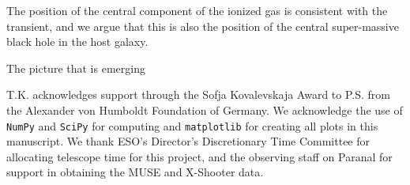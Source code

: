 \documentclass[traditabstract]{aa}
\begin{document}
The position of the central component of the ionized gas is consistent with the transient, and we argue that this is also the position of the central super-massive black hole in the host galaxy. 


The picture that is emerging


\begin{acknowledgements}

T.K. acknowledges support through the Sofja Kovalevskaja Award to P.S. from the Alexander von Humboldt Foundation of Germany.  We acknowledge the use of \texttt{NumPy} and \texttt{SciPy} \citep{Walt:2011:NAS:1957373.1957466} for computing and \texttt{matplotlib} \citep{Hunter:2007} for creating all plots in this manuscript. We thank ESO's Director's Discretionary Time Committee for allocating telescope time for this project, and the observing staff on Paranal for support in obtaining the MUSE and X-Shooter data.

\end{acknowledgements}






\end{document}
